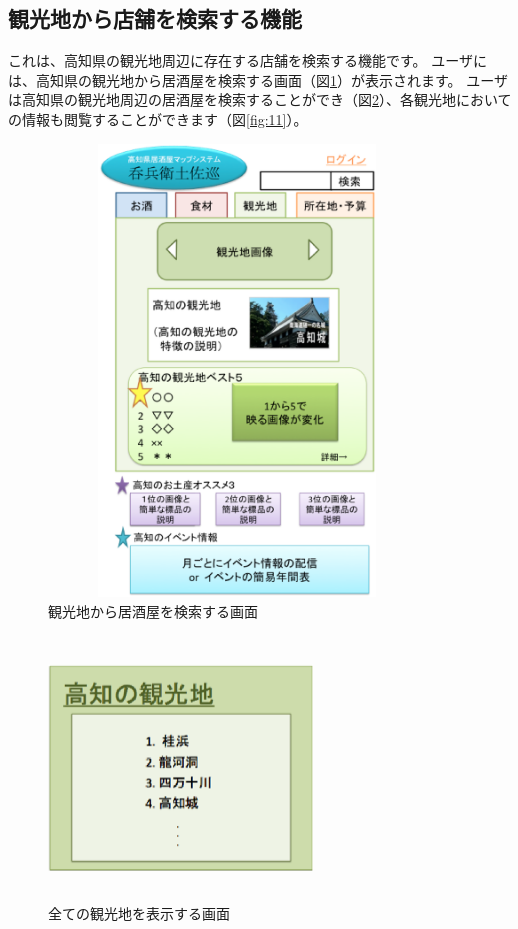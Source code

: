 \documentclass[a4j,titlepage]{jarticle}
\begin{document}
\subsection{観光地から店舗を検索する機能}
これは、高知県の観光地周辺に存在する店舗を検索する機能です。
ユーザには、高知県の観光地から居酒屋を検索する画面（図\ref{fig:9}）が表示されます。
ユーザは高知県の観光地周辺の居酒屋を検索することができ（図\ref{fig:10}）、各観光地においての情報も閲覧することができます（図\ref{fig:11}）。

\begin {figure}[htpb]
    \begin{center}
    \includegraphics [height=12cm, width=10cm]{extrnal_design_document_image/9.eps}
    \caption {観光地から居酒屋を検索する画面}
    \label {fig:9}
    \end{center}
\end {figure}

\begin {figure}[htpb]
    \begin{center}
    \includegraphics [height=7cm, width=7cm]{extrnal_design_document_image/10.eps}
    \caption {全ての観光地を表示する画面}
    \label {fig:10}
    \end{center}
\end {figure}
\end{document}
